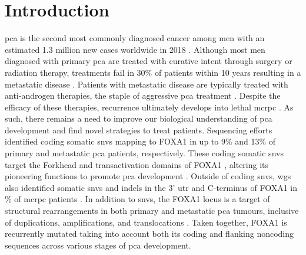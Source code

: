 \section{Introduction}

\Gls{pca} is the second most commonly diagnosed cancer among men with an estimated 1.3 million new cases worldwide in 2018 \cite{brayGlobalCancerStatistics2018}.
Although most men diagnosed with primary \gls{pca} are treated with curative intent through surgery or radiation therapy, treatments fail in 30\% of patients within 10 years \cite{boorjianLongTermOutcomeRadical2007} resulting in a metastatic disease \cite{litwinDiagnosisTreatmentProstate2017}.
Patients with metastatic disease are typically treated with anti-androgen therapies, the staple of aggressive \gls{pca} treatment \cite{attardProstateCancer2016}.
Despite the efficacy of these therapies, recurrence ultimately develops into lethal \gls{mcrpc} \cite{attardProstateCancer2016}.
As such, there remains a need to improve our biological understanding of \gls{pca} development and find novel strategies to treat patients.
Sequencing efforts identified coding somatic \glspl{snv} mapping to FOXA1 in up to 9\% \cite{abeshouseMolecularTaxonomyPrimary2015,fraserGenomicHallmarksLocalized2017,barbieriExomeSequencingIdentifies2012, grassoMutationalLandscapeLethal2012,paroliaDistinctStructuralClasses2019,adamsFOXA1MutationsAlter2019} and 13\% \cite{paroliaDistinctStructuralClasses2019,adamsFOXA1MutationsAlter2019,robinsonIntegrativeClinicalGenomics2015} of primary and metastatic \gls{pca} patients, respectively.
These coding somatic \glspl{snv} target the Forkhead and transactivation domains of FOXA1 \cite{robinsonFOXA1MutationsHormonedependent2013}, altering its pioneering functions to promote \gls{pca} development \cite{adamsFOXA1MutationsAlter2019,gaoForkheadDomainMutations2019}.
Outside of coding \glspl{snv}, \gls{wgs} also identified somatic \glspl{snv} and indels in the 3' \gls{utr} and C-terminus of FOXA1 in \% of \gls{mcrpc} patients \cite{annalaFrequentMutationFOXA12018}.
In addition to \glspl{snv}, the FOXA1 locus is a target of structural rearrangements in both primary and metastatic \gls{pca} tumours, inclusive of duplications, amplifications, and translocations \cite{paroliaDistinctStructuralClasses2019,adamsFOXA1MutationsAlter2019}.
Taken together, FOXA1 is recurrently mutated taking into account both its coding and flanking noncoding sequences across various stages of \gls{pca} development.

